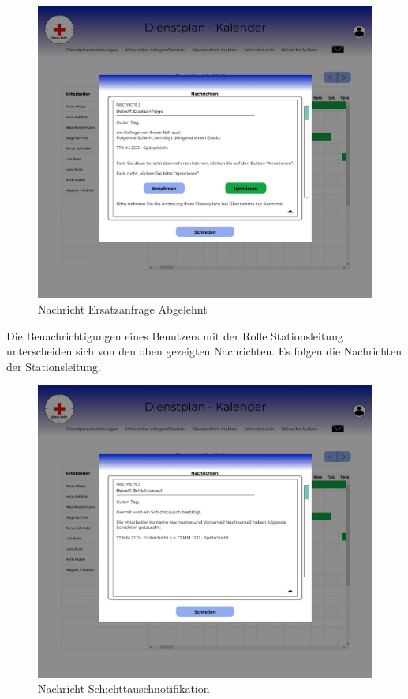\documentclass[11pt,
paper=a4,
bibtotocnumbered,	  %
liststotocnumbered,  %
DIV=calc,		  %
tablecaptionabove,	  %
headinclude,
]{article}
\begin{document}
\begin{figure}[H]
\includegraphics[width=1\textwidth]{Bilder/Screens/NachrichtErsatzanfrageabgelehnt.jpg}{\centering}
\caption{Nachricht Ersatzanfrage Abgelehnt}
\end{figure}
Die Benachrichtigungen eines Benutzers mit der Rolle Stationsleitung unterscheiden sich von den oben gezeigten Nachrichten. Es folgen die Nachrichten der Stationsleitung.
\begin{figure}[H]
\includegraphics[width=1\textwidth]{Bilder/Screens/NachrichtStatleitungSchichttausch.jpg}{\centering}
\caption{Nachricht Schichttauschnotifikation}
\end{figure}
\end{document}
